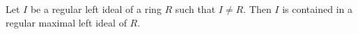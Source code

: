 Let $I$ be a regular left ideal of a ring $R$ such that $I \neq R$. Then $I$ is contained in a regular maximal left ideal of $R$.
